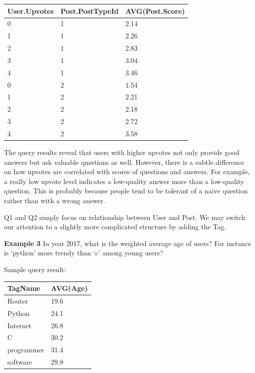 \begin {center}
\begin{tabular}{ l l l }
	User.Upvotes&Post.PostTypeId&AVG(Post.Score)\\\hline
	0&1&2.14\\
	1&1&2.26\\
	2&1&2.83\\
	3&1&3.04\\
	4&1&3.46\\
	0&2&1.54\\
	1&2&2.21\\
	2&2&2.18\\
	3&2&2.72\\
	4&2&3.58\\\hline
\end{tabular}
\end {center}

The query results reveal that users with higher upvotes not only provide good answers but ask valuable questions as well. However, there is a subtle difference on how upvotes are correlated with scores of questions and answers. For example, a really low upvote level indicates a low-quality answer more than a low-quality question. This is probably because people tend to be tolerant of a naive question rather than with a wrong answer.

Q1 and Q2 simply focus on relationship between User and Post. We may switch our attention to a slightly more complicated structure by adding the Tag.

\noindent\textbf{Example 3} In year 2017, what is the weighted average age of users? For instance is ‘python’ more trendy than ‘c’ among young users?



Sample query result:

\begin {center}
\begin{tabular}{ l l  }
	
	TagName&AVG(Age)\\\hline
	Router&19.6\\
	Python&24.1\\
	Internet&26.8\\
	C&30.2\\
	programmer&31.4\\
	software&29.8\\\hline
	
\end{tabular}
\end {center}

